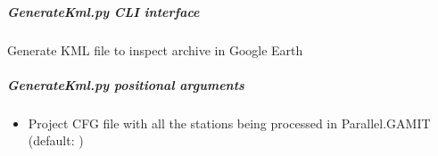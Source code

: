 \documentclass[letterpaper,10pt,english]{sphinxmanual}
\begin{document}
\begin{fulllineitems}
\label{\detokenize{pgamit.com:pgamit.com.GenerateKml.plot_rinex}}
\pysigstartsignatures
\pysiglinewithargsret
{}
{\sphinxparamcomma {}\sphinxparamcomma {}}
{}
\pysigstopsignatures
\end{fulllineitems}


\begin{fulllineitems}
\label{\detokenize{pgamit.com:pgamit.com.GenerateKml.plot_station_info_rinex}}
\pysigstartsignatures
\pysiglinewithargsret
{}
{\sphinxparamcomma {}\sphinxparamcomma {}\sphinxparamcomma {}}
{}
\pysigstopsignatures
\end{fulllineitems}



\subparagraph{GenerateKml.py \sphinxhyphen{} CLI interface}
\label{\detokenize{pgamit.com:GenerateKml.py---CLI-interface}}
\sphinxAtStartPar
Generate KML file to inspect archive in Google Earth

\begin{sphinxVerbatim}[commandchars=\\\{\}]
 \PYG{p}{[}\PYG{p}{]} \PYG{p}{[} \PYG{p}{[}\PYG{p}{]} \PYG{p}{[}\PYG{p}{[}\PYG{p}{]} \PYG{p}{]}\PYG{p}{]} \PYG{p}{[}\PYG{p}{]} \PYG{p}{[}\PYG{p}{]}
               \PYG{p}{[} \PYG{p}{]} \PYG{p}{[}\PYG{p}{]}
                 
\end{sphinxVerbatim}


\subparagraph{GenerateKml.py positional arguments}
\label{\detokenize{pgamit.com:GenerateKml.py-positional-arguments}}\begin{itemize}
\item {} 
\sphinxAtStartPar
{\hyperref[\detokenize{pgamit.com:GenerateKml.py-_project-cfg-file_}]{}} \sphinxhyphen{} Project CFG file with all the stations being processed in Parallel.GAMIT (default: )

\end{itemize}
\end{document}
